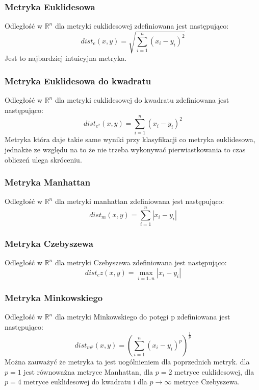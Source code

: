 \documentclass{classrep}
\begin{document}
\subsubsection{Metryka Euklidesowa}
Odległość w $\mathbb{R}^n$ dla metryki euklidesowej zdefiniowana jest następująco:
\begin{equation*}
dist_e(x,y) = \sqrt{\sum_{i=1}^n (x_i - y_i)^2}
\end{equation*}
Jest to najbardziej intuicyjna metryka.

\subsubsection{Metryka Euklidesowa do kwadratu}
Odległość w $\mathbb{R}^n$ dla metryki euklidesowej do kwadratu zdefiniowana jest następująco:
\begin{equation*}
dist_{e^2}(x,y) = \sum_{i=1}^n (x_i - y_i)^2
\end{equation*}
Metryka która daje takie same wyniki przy klasyfikacji co metryka euklidesowa, jednakże ze względu na to że nie trzeba wykonywać pierwiastkowania to czas obliczeń ulega skróceniu.


\subsubsection{Metryka Manhattan}
Odległość w $\mathbb{R}^n$ dla metryki manhattan zdefiniowana jest następująco:
\begin{equation*}
dist_m(x,y) = \sum_{i=1}^n |x_i - y_i|
\end{equation*}

\subsubsection{Metryka Czebyszewa}
Odległość w $\mathbb{R}^n$ dla metryki Czebyszewa zdefiniowana jest następująco:
\begin{equation*}
dist_cz(x,y) = \max_{i=1..n} |x_i - y_i|
\end{equation*}

\subsubsection{Metryka Minkowskiego}
Odległość w $\mathbb{R}^n$ dla metryki Minkowskiego do potęgi p zdefiniowana jest następująco:
\begin{equation*}
dist_{m^p}(x,y) = \left({\sum_{i=1}^n (x_i - y_i)^p}\right)^{\frac{1}{p}}
\end{equation*}
Można zauważyć że metryka ta jest uogólnieniem dla poprzednich metryk. dla $p=1$ jest równoważna metryce Manhattan, dla $p=2$ metryce euklidesowej, dla $p=4$ metryce euklidesowej do kwadratu i dla $p\rightarrow\infty$ metryce Czebyszewa.
\end{document}
